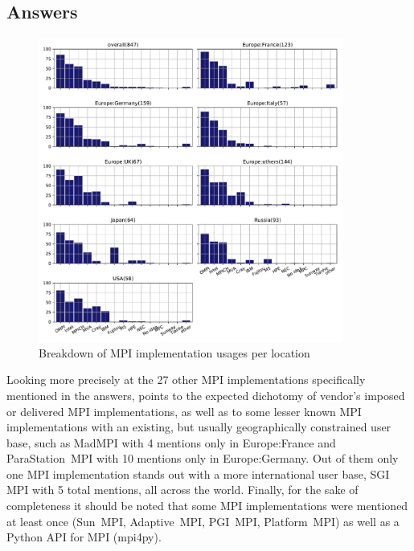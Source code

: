 
\subsection{Answers}


\begin{figure}[htb]
\begin{center}
\includegraphics[width=10cm]{../pdfs/Q12.pdf}
\caption{Breakdown of MPI implementation usages per location}
\label{fig:Q12}
\end{center}
\end{figure}

Looking more precisely at the 27 other MPI implementations specifically
mentioned in the answers, points to the expected dichotomy of vendor's imposed
or delivered MPI implementations, as well as to some lesser known MPI
implementations with an existing, but usually geographically constrained user
base, such as MadMPI with 4 mentions only in Europe:France and ParaStation~MPI
with 10 mentions only in Europe:Germany. Out of them only one MPI implementation
stands out with a more international user base, SGI MPI with 5 total mentions,
all across the world. Finally, for the sake of completeness it should be noted
that some MPI implementations were mentioned at least once (Sun~MPI,
Adaptive~MPI, PGI~MPI, Platform~MPI) as well as a Python API for MPI (mpi4py).


